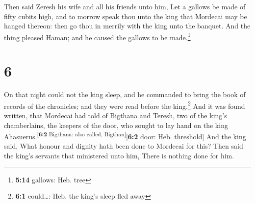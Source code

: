  Then said Zeresh his wife and all his friends unto him,
Let a gallows be made of fifty cubits high, and to morrow speak thou
unto the king that Mordecai may be hanged thereon: then go thou in
merrily with the king unto the banquet. And the thing pleased Haman; and
he caused the gallows to be made.\footnote{\textbf{5:14} gallows: Heb.
  tree}

\hypertarget{section-5}{%
\section{6}\label{section-5}}

 On that night could not the king sleep, and he commanded
to bring the book of records of the chronicles; and they were read
before the king.\footnote{\textbf{6:1} could\ldots: Heb. the king's
  sleep fled away}  And it was found written, that
Mordecai had told of Bigthana and Teresh, two of the king's
chamberlains, the keepers of the door, who sought to lay hand on the
king Ahasuerus.\textsuperscript{{[}\textbf{6:2} Bigthana: also called,
Bigthan{]}}{[}\textbf{6:2} door: Heb. threshold{]}  And
the king said, What honour and dignity hath been done to Mordecai for
this? Then said the king's servants that ministered unto him, There is
nothing done for him.

